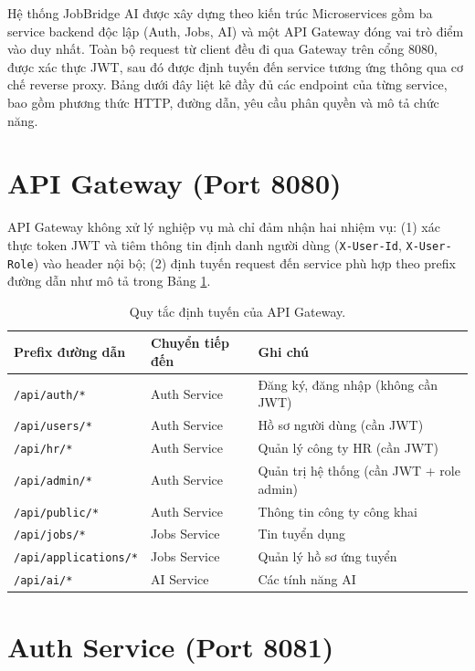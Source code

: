 \documentclass[../DoAn.tex]{subfiles}
\begin{document}
Hệ thống JobBridge AI được xây dựng theo kiến trúc Microservices gồm ba service backend độc lập (Auth, Jobs, AI) và một API Gateway đóng vai trò điểm vào duy nhất. Toàn bộ request từ client đều đi qua Gateway trên cổng 8080, được xác thực JWT, sau đó được định tuyến đến service tương ứng thông qua cơ chế reverse proxy. Bảng dưới đây liệt kê đầy đủ các endpoint của từng service, bao gồm phương thức HTTP, đường dẫn, yêu cầu phân quyền và mô tả chức năng.

\section{API Gateway (Port 8080)}

API Gateway không xử lý nghiệp vụ mà chỉ đảm nhận hai nhiệm vụ: (1) xác thực token JWT và tiêm thông tin định danh người dùng (\texttt{X-User-Id}, \texttt{X-User-Role}) vào header nội bộ; (2) định tuyến request đến service phù hợp theo prefix đường dẫn như mô tả trong Bảng \ref{tab:api-gateway}.

\begin{table}[H]
\centering
\caption{Quy tắc định tuyến của API Gateway.}
\label{tab:api-gateway}
\small
\begin{tabular}{|p{4.5cm}|p{4cm}|p{5.5cm}|}
\hline
\textbf{Prefix đường dẫn} & \textbf{Chuyển tiếp đến} & \textbf{Ghi chú} \\ \hline
\texttt{/api/auth/*} & Auth Service & Đăng ký, đăng nhập (không cần JWT) \\ \hline
\texttt{/api/users/*} & Auth Service & Hồ sơ người dùng (cần JWT) \\ \hline
\texttt{/api/hr/*} & Auth Service & Quản lý công ty HR (cần JWT) \\ \hline
\texttt{/api/admin/*} & Auth Service & Quản trị hệ thống (cần JWT + role admin) \\ \hline
\texttt{/api/public/*} & Auth Service & Thông tin công ty công khai \\ \hline
\texttt{/api/jobs/*} & Jobs Service & Tin tuyển dụng \\ \hline
\texttt{/api/applications/*} & Jobs Service & Quản lý hồ sơ ứng tuyển \\ \hline
\texttt{/api/ai/*} & AI Service & Các tính năng AI \\ \hline
\end{tabular}
\end{table}

\section{Auth Service (Port 8081)}
\end{document}
